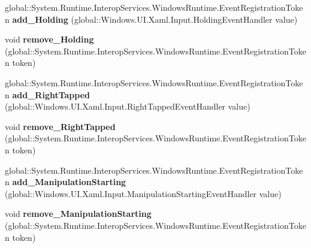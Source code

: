 \begin{DoxyCompactItemize}
global\+::\+System.\+Runtime.\+Interop\+Services.\+Windows\+Runtime.\+Event\+Registration\+Token {\bfseries add\+\_\+\+Holding} (global\+::\+Windows.\+U\+I.\+Xaml.\+Input.\+Holding\+Event\+Handler value)
\item 
\mbox{\label{interface_windows_1_1_u_i_1_1_xaml_1_1_i_u_i_element_a731b5111082558a2945d799084cfbd79}} 
void {\bfseries remove\+\_\+\+Holding} (global\+::\+System.\+Runtime.\+Interop\+Services.\+Windows\+Runtime.\+Event\+Registration\+Token token)
\item 
\mbox{\label{interface_windows_1_1_u_i_1_1_xaml_1_1_i_u_i_element_ae3a5c2e71c2ae0d8a2d7ce2beb34673e}} 
global\+::\+System.\+Runtime.\+Interop\+Services.\+Windows\+Runtime.\+Event\+Registration\+Token {\bfseries add\+\_\+\+Right\+Tapped} (global\+::\+Windows.\+U\+I.\+Xaml.\+Input.\+Right\+Tapped\+Event\+Handler value)
\item 
\mbox{\label{interface_windows_1_1_u_i_1_1_xaml_1_1_i_u_i_element_a3582ef21b0d8aa47e220b343772155be}} 
void {\bfseries remove\+\_\+\+Right\+Tapped} (global\+::\+System.\+Runtime.\+Interop\+Services.\+Windows\+Runtime.\+Event\+Registration\+Token token)
\item 
\mbox{\label{interface_windows_1_1_u_i_1_1_xaml_1_1_i_u_i_element_a893f1fc019c5b01a9edcf81dbae7fb71}} 
global\+::\+System.\+Runtime.\+Interop\+Services.\+Windows\+Runtime.\+Event\+Registration\+Token {\bfseries add\+\_\+\+Manipulation\+Starting} (global\+::\+Windows.\+U\+I.\+Xaml.\+Input.\+Manipulation\+Starting\+Event\+Handler value)
\item 
\mbox{\label{interface_windows_1_1_u_i_1_1_xaml_1_1_i_u_i_element_aacad93dba45c725c051fd835e8599cc8}} 
void {\bfseries remove\+\_\+\+Manipulation\+Starting} (global\+::\+System.\+Runtime.\+Interop\+Services.\+Windows\+Runtime.\+Event\+Registration\+Token token)
\item 
\mbox{\label{interface_windows_1_1_u_i_1_1_xaml_1_1_i_u_i_element_a8b3a684ee7f64d2a3b27633301a58825}} 

\end{DoxyCompactItemize}
